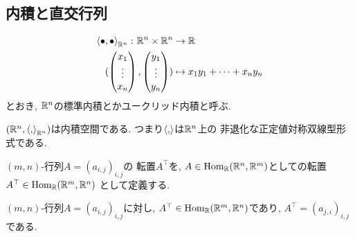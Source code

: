 \subsection{内積と直交行列}
\begin{align*}
  \Braket{\bullet,\bullet}_{\mathbb{R}^n}\colon \mathbb{R}^n \times \mathbb{R}^n &\to \mathbb{R}\\
  (\begin{pmatrix}x_1\\\vdots\\x_n\end{pmatrix},\begin{pmatrix}y_1\\\vdots\\y_n\end{pmatrix})
      &\mapsto x_1y_1+\cdots+x_ny_n
\end{align*}
とおき,
$\mathbb{R}^n$の標準内積とかユークリッド内積と呼ぶ.
\begin{prop}
  $(\mathbb{R}^n,\Braket{,}_{\mathbb{R}^n})$は内積空間である.
  つまり$\Braket{,}$は$\mathbb{R}^n$上の
  非退化な正定値対称双線型形式である.
\end{prop}
\begin{definition}
  $(m,n)$-行列$A=(a_{i,j})_{i,j}$の
  転置$A^\top$を,
  $A\in\operatorname{Hom}_{\mathbb{R}}(\mathbb{R}^n,\mathbb{R}^m)$としての転置$A^\top\in\operatorname{Hom}_{\mathbb{R}}(\mathbb{R}^m,\mathbb{R}^n)$
  として定義する.
\end{definition}
\begin{prop}
  $(m,n)$-行列$A=(a_{i,j})_{i,j}$に対し,
  $A^\top\in \operatorname{Hom}_{\mathbb{R}}(\mathbb{R}^m,\mathbb{R}^n)$であり,
  $A^\top=(a_{j,i})_{i,j}$である.
\end{prop}
